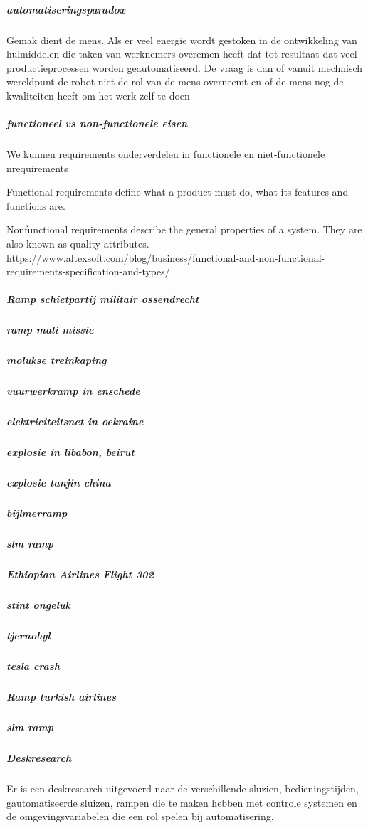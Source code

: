 \subparagraph{automatiseringsparadox }
Gemak dient de mens. Als er veel energie wordt gestoken in de ontwikkeling van hulmiddelen die taken van 
werknemers overemen heeft dat tot resultaat dat veel productieprocessen worden geautomatiseerd. De vraag is 
dan of vanuit mechnisch wereldpunt de robot niet de rol van de mens overneemt en of de mens nog de kwaliteiten 
heeft om het werk zelf te doen 

\subparagraph{functioneel vs non-functionele eisen }
We kunnen requirements onderverdelen in functionele en niet-functionele nrequirements

Functional requirements define what a product must do, what its features and functions are.


Nonfunctional requirements describe the general properties of a system. They are also known as quality attributes.
https://www.altexsoft.com/blog/business/functional-and-non-functional-requirements-specification-and-types/

\subparagraph{Ramp schietpartij militair ossendrecht }
\subparagraph{ramp mali missie }
\subparagraph{molukse treinkaping }
\subparagraph{vuurwerkramp in enschede }
\subparagraph{elektriciteitsnet in oekraine }
\subparagraph{explosie in libabon, beirut }
\subparagraph{explosie tanjin china }
\subparagraph{bijlmerramp }
\subparagraph{slm ramp }
\subparagraph{Ethiopian Airlines Flight 302 }

\subparagraph{stint ongeluk }
\subparagraph{tjernobyl  }
\subparagraph{tesla crash  }
\subparagraph{Ramp turkish airlines  }
\subparagraph{slm ramp }
\subparagraph{Deskresearch}
Er is een deskresearch uitgevoerd naar de verschillende sluzien, bedieningstijden, gautomatiseerde sluizen, rampen die te maken hebben met controle systemen en de omgevingsvariabelen die een rol spelen bij automatisering.




